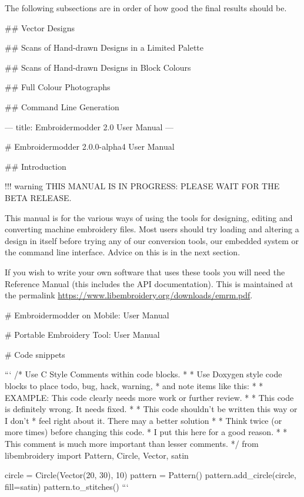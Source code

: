 The following subsections are in order of how good the final results should be.

## Vector Designs


## Scans of Hand-drawn Designs in a Limited Palette


## Scans of Hand-drawn Designs in Block Colours


## Full Colour Photographs

## Command Line Generation

---
title: Embroidermodder 2.0 User Manual
---

# Embroidermodder 2.0.0-alpha4  User Manual

## Introduction

!!! warning
    THIS MANUAL IS IN PROGRESS: PLEASE WAIT FOR THE BETA RELEASE.

This manual is for the various ways of using the \embname tools for designing,
editing and converting machine embroidery files. Most users should try loading and altering a design
in \embname itself before trying any of our conversion tools, our embedded system
or the command line interface. Advice on this is in the next section.

If you wish to write your own
software that uses these tools you will need the \embname Reference Manual (this
includes the API documentation). This is maintained at the permalink
\url{https://www.libembroidery.org/downloads/emrm.pdf}.

# Embroidermodder on Mobile: User Manual

# Portable Embroidery Tool: User Manual

# Code snippets

```
/* Use C Style Comments within code blocks.
 *
 * Use Doxygen style code blocks to place todo, bug, hack, warning,
 * and note items like this:
 *
 * \todo EXAMPLE: This code clearly needs more work or further review.
 *
 * \bug This code is definitely wrong. It needs fixed.
 *
 * \hack This code shouldn't be written this way or I don't
 * feel right about it. There may a better solution
 *
 * \warning Think twice (or more times) before changing this code.
 * I put this here for a good reason.
 *
 * \note This comment is much more important than lesser comments.
 */
from libembroidery import Pattern, Circle, Vector, satin

circle = Circle(Vector(20, 30), 10)
pattern = Pattern()
pattern.add_circle(circle, fill=satin)
pattern.to_stitches()
```

